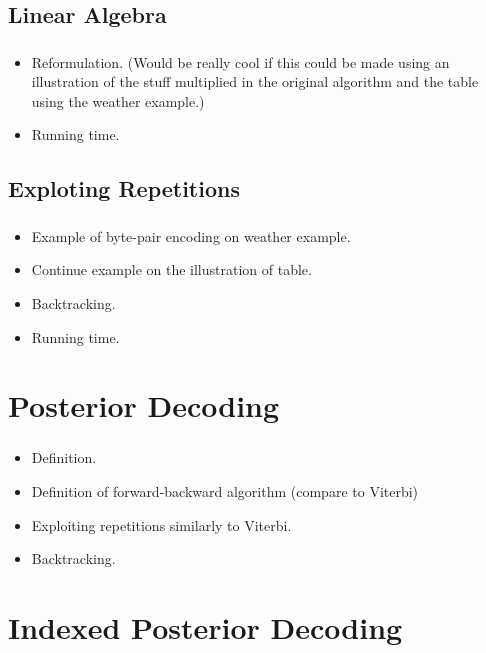 \documentclass[english,notes]{beamer}
\begin{document}
\subsection{Linear Algebra}

\begin{frame}
  \frametitle{\insertsubsection}
  \begin{itemize}
    \tiny
  \item Reformulation. (Would be really cool if this could be made using an
    illustration of the stuff multiplied in the original algorithm and the
    table using the weather example.)
  \item Running time.
  \end{itemize}
\end{frame}

\subsection{Exploting Repetitions}

\begin{frame}
  \frametitle{\insertsubsection}
  \begin{itemize}
    \tiny
  \item Example of byte-pair encoding on weather example.
  \item Continue example on the illustration of table.
  \item Backtracking.
  \item Running time.
  \end{itemize}
\end{frame}

\section{Posterior Decoding}

\begin{frame}
  \frametitle{\insertsection}
  \begin{itemize}
    \tiny
  \item Definition.
  \item Definition of forward-backward algorithm (compare to Viterbi)
  \item Exploiting repetitions similarly to Viterbi.
  \item Backtracking.
  \end{itemize}
\end{frame}

\section{Indexed Posterior Decoding}
\end{document}

